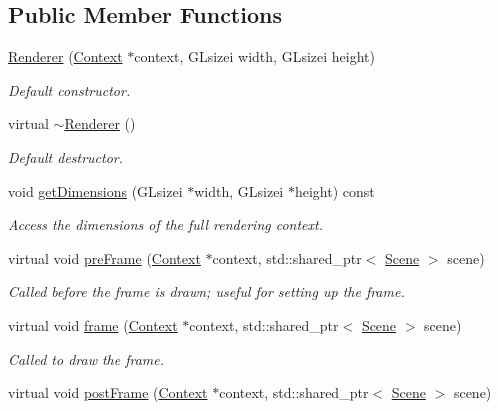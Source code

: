 \subsection*{Public Member Functions}
\begin{DoxyCompactItemize}
\item 
\hyperlink{class_renderer_a21f9183202b351da1d4c9d20fbf6a7db}{Renderer} (\hyperlink{class_context}{Context} $\ast$context, G\+Lsizei width, G\+Lsizei height)
\begin{DoxyCompactList}\small\item\em Default constructor. \end{DoxyCompactList}\item 
virtual \hyperlink{class_renderer_afeee408862d5bd6255a6882d47e6d5cd}{$\sim$\+Renderer} ()
\begin{DoxyCompactList}\small\item\em Default destructor. \end{DoxyCompactList}\item 
void \hyperlink{class_renderer_a3a63289ee0d3b291b43f8c99d445140a}{get\+Dimensions} (G\+Lsizei $\ast$width, G\+Lsizei $\ast$height) const 
\begin{DoxyCompactList}\small\item\em Access the dimensions of the full rendering context. \end{DoxyCompactList}\item 
virtual void \hyperlink{class_renderer_a73b37f476662d7dcbc8f02b1ee8b7e66}{pre\+Frame} (\hyperlink{class_context}{Context} $\ast$context, std\+::shared\+\_\+ptr$<$ \hyperlink{class_scene}{Scene} $>$ scene)
\begin{DoxyCompactList}\small\item\em Called before the frame is drawn; useful for setting up the frame. \end{DoxyCompactList}\item 
virtual void \hyperlink{class_renderer_ac6bd2531e087c99d44298100a1db7631}{frame} (\hyperlink{class_context}{Context} $\ast$context, std\+::shared\+\_\+ptr$<$ \hyperlink{class_scene}{Scene} $>$ scene)
\begin{DoxyCompactList}\small\item\em Called to draw the frame. \end{DoxyCompactList}\item 
virtual void \hyperlink{class_renderer_affc664549db066d9219579f8fd5cd657}{post\+Frame} (\hyperlink{class_context}{Context} $\ast$context, std\+::shared\+\_\+ptr$<$ \hyperlink{class_scene}{Scene} $>$ scene)

\end{DoxyCompactItemize}
